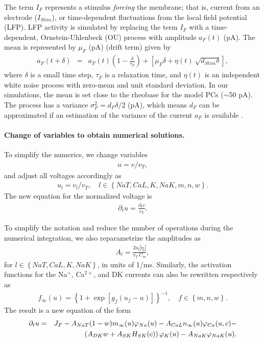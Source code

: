 \documentclass[10pt,letterpaper]{article}
\newcommand{\Ca}{Ca$^{2+}$}
\newcommand{\Na}{Na$^{+}$}
\newcommand{\lrRound}[1]{\left(#1\right)}
\newcommand{\lrSquare}[1]{\left[#1\right]}
\newcommand{\lrSet}[1]{\left\{#1\right\}}
\begin{document}
The term $I_{F}$ represents a stimulus \textit{forcing} the membrane; that is, current from an electrode ($I_{Stim}$), or time-dependent fluctuations from the local field potential (LFP). LFP activity is simulated by replacing the term $I_{F}$ with a  time-dependent, Ornstein-Uhlenbeck (OU) process with amplitude $a_{F}(t)$ (pA). The mean is represented by  $\mu_{F}$ (pA) (drift term)
\cite{rudolph2003characterization} given by \cite{gillespie1996exact} 
\begin{eqnarray}
\label{eq:OU}
{a}_{F}(t+\delta) &=& a_{F}(t) \lrRound{1 -  \frac{\delta}{\tau_{F}}}  +
\lrSquare{ \mu_{F} \delta + \eta(t) ~\sqrt{d_{Stim} \delta}},
\end{eqnarray}
where $\delta$ is a small time step, $\tau_{F}$ is a relaxation time, and $\eta(t)$ is an independent
white noise process with zero-mean and unit standard deviation. In our simulations, the mean is set close to the rheobase for the model PCs ($\sim$50 pA). The process has a variance
$\sigma_{F}^2 = d_{F} \delta /2$ (pA), which means $d_{F}$ can be
approximated if an estimation of the variance of the current $a_{F}$ is
available \cite{rudolph2004method,destexhe2004novel}.  

\paragraph{Change of variables to obtain numerical solutions.}
To simplify the numerics, we change variables 
\begin{eqnarray}
    u = v/v_T, 
\end{eqnarray}
and adjust all voltages accordingly as 
\begin{eqnarray}
    u_l = v_l/v_T, \quad l \in \left\{NaT,CaL,K,NaK,m,n,w \right\}.
\end{eqnarray}
The new equation for the normalized voltage is 
\begin{eqnarray}
    \partial_t u = \frac{\partial_t v}{v_T}.
\end{eqnarray}

To simplify the notation and reduce the number of operations during the numerical integration, we also reparametrize the amplitudes as 
\begin{eqnarray}
\label{eq:normA}
A_l = \frac{2 a_l |\eta_l|}{v_T~C_m}, 
\end{eqnarray} 
for $l \in \left\{NaT,CaL,K,NaK \right\}$, in units of 1/ms. 
Similarly,
the activation functions for the {\Na}, {\Ca}, and DK currents can also be rewritten respectively
as 
\begin{eqnarray}
f_{\infty}(u) = \lrSet{1 + \exp\left[g_f \left(u_f-u \right) \right]}^{-1}, \quad{f \in  \left\{m,n,w \right\}}.
\end{eqnarray}
The result is a new equation of the form
\begin{eqnarray}
\partial_t u &=& J_F -A_{NaT}(1-w)m_{\infty}(u) \varphi_{Na}(u) - A_{CaL}n_{\infty}(u) \varphi_{Ca}(u,c)- \notag \\
&& \left(A_{DK}w + A_{SK}H_{SK}(c)\right)\varphi_{K}(u)- A_{NaK}\varphi_{NaK}(u
).
\end{eqnarray}
 
\end{document}
